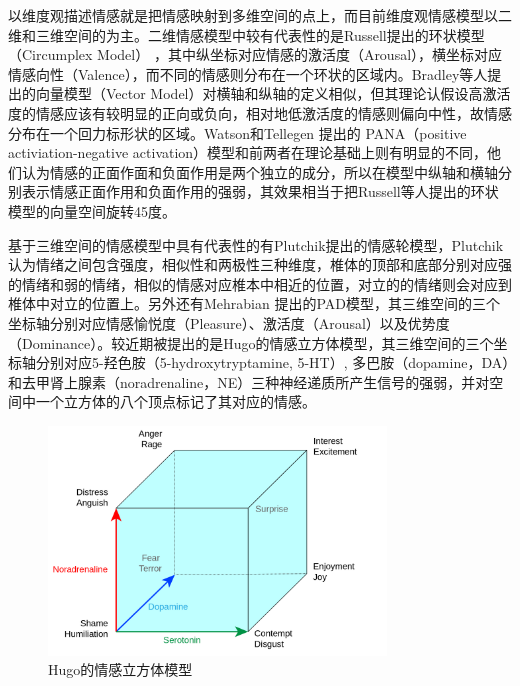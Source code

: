 以维度观描述情感就是把情感映射到多维空间的点上，而目前维度观情感模型以二维和三维空间的为主。二维情感模型中较有代表性的是Russell提出的环状模型（Circumplex Model）\cite{Russell1980Cir} ，其中纵坐标对应情感的激活度（Arousal），横坐标对应情感向性（Valence），而不同的情感则分布在一个环状的区域内。Bradley等人\cite{Bradley1992Rem}提出的向量模型（Vector Model）对横轴和纵轴的定义相似，但其理论认假设高激活度的情感应该有较明显的正向或负向，相对地低激活度的情感则偏向中性，故情感分布在一个回力标形状的区域。Watson和Tellegen \cite{Watson1985Tow} 提出的 PANA（positive activiation-negative activation）模型和前两者在理论基础上则有明显的不同，他们认为情感的正面作面和负面作用是两个独立的成分，所以在模型中纵轴和横轴分别表示情感正面作用和负面作用的强弱，其效果相当于把Russell等人提出的环状模型的向量空间旋转45度\cite{Rubin2009A}。

基于三维空间的情感模型中具有代表性的有Plutchik\cite{Plutchik1980Emo}提出的情感轮模型，Plutchik认为情绪之间包含强度，相似性和两极性三种维度，椎体的顶部和底部分别对应强的情绪和弱的情绪，相似的情感对应椎本中相近的位置，对立的的情绪则会对应到椎体中对立的位置上。另外还有Mehrabian \cite{Mehrabian1996Pleasure}提出的PAD模型，其三维空间的三个坐标轴分别对应情感愉悦度（Pleasure）、激活度（Arousal）以及优势度（Dominance）。较近期被提出的是Hugo\cite{Hugo2012A}的情感立方体模型，其三维空间的三个坐标轴分别对应5-羟色胺（5-hydroxytryptamine, 5-HT）, 多巴胺（dopamine，DA）和去甲肾上腺素（noradrenaline，NE）三种神经递质所产生信号的强弱，并对空间中一个立方体的八个顶点标记了其对应的情感。

\begin{figure}[H] %
  \centering
  \includegraphics[width=0.8\textwidth]{img/hugo_cube_of_emotion.png}
  \caption{Hugo\cite{Hugo2012A}的情感立方体模型}
  \label{fig:hugo_cube_of_emotion}
\end{figure}


